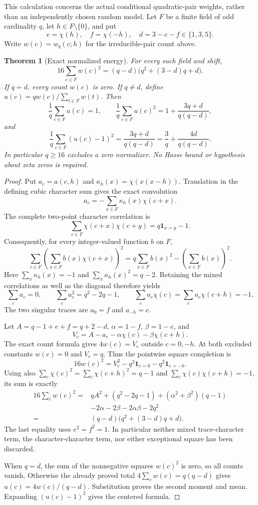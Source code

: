 \documentclass[11pt]{article}
\newtheorem{theorem}{Theorem}[section]
\begin{document}
This calculation concerns the actual conditional quadratic-pair weights,
rather than an independently chosen random model. Let \(F\) be a finite
field of odd cardinality \(q\), let \(h\in F\setminus\{0\}\), and put
\[
 e=\chi(h),\quad f=\chi(-h),\quad d=3-e-f\in\{1,3,5\}.
\]
Write \(w(c)=w_q(c;h)\) for the irreducible-pair count above.

\begin{theorem}[Exact normalized energy]\label{thm:quadraticPairEnergy}
For every such field and shift,
\[
 16\sum_{c\in F}w(c)^2
   =(q-d)\bigl(q^2+(3-d)q+d\bigr).
\]
If \(q=d\), every count \(w(c)\) is zero. If \(q\ne d\), define
\(u(c)=qw(c)/\sum_{t\in F}w(t)\). Then
\[
 \frac1q\sum_{c\in F}u(c)=1,\qquad
 \frac1q\sum_{c\in F}u(c)^2
   =1+\frac{3q+d}{q(q-d)},
\]
and
\[
 \frac1q\sum_{c\in F}(u(c)-1)^2
    =\frac{3q+d}{q(q-d)}
    =\frac3q+\frac{4d}{q(q-d)}.
\]
In particular \(q\geq16\) excludes a zero normalizer. No Hasse
bound or hypothesis about zeta zeros is required.
\end{theorem}

\begin{proof}
Put \(a_c=a(c,h)\) and \(\kappa_h(x)=\chi(x(x-h))\).
Translation in the defining cubic character sum gives the exact convolution
\[
 a_c=-\sum_{x\in F}\kappa_h(x)\chi(c+x).
\]
The complete two-point character correlation is
\[
 \sum_{c\in F}\chi(c+x)\chi(c+y)=q\mathbf1_{x=y}-1.
\]
Consequently, for every integer-valued function \(b\) on \(F\),
\[
 \sum_{c\in F}\left(\sum_{x\in F}b(x)\chi(c+x)\right)^2
    =q\sum_{x\in F}b(x)^2-\left(\sum_{x\in F}b(x)\right)^2.
\]
Here \(\sum_x\kappa_h(x)=-1\) and
\(\sum_x\kappa_h(x)^2=q-2\). Retaining the mixed correlations as
well as the diagonal therefore yields
\[
 \sum_ca_c=0,\qquad \sum_ca_c^2=q^2-2q-1,\qquad
 \sum_ca_c\chi(c)=\sum_ca_c\chi(c+h)=-1.
\]
The two singular traces are \(a_0=f\) and \(a_{-h}=e\).

Let \(A=q-1+e+f=q+2-d\), \(\alpha=1-f\), \(\beta=1-e\), and
\[
 V_c=A-a_c-\alpha\chi(c)-\beta\chi(c+h).
\]
The exact count formula gives \(4w(c)=V_c\) outside \(c=0,-h\).
At both excluded constants \(w(c)=0\) and \(V_c=q\). Thus the
pointwise square completion is
\[
 16w(c)^2=V_c^2-q^2\mathbf1_{c=0}-q^2\mathbf1_{c=-h}.
\]
Using also \(\sum_c\chi(c)^2=\sum_c\chi(c+h)^2=q-1\) and
\(\sum_c\chi(c)\chi(c+h)=-1\), its sum is exactly
\[
\begin{split}
 16\sum_cw(c)^2={}&qA^2+(q^2-2q-1)
       +(\alpha^2+\beta^2)(q-1)\\
       &-2\alpha-2\beta-2\alpha\beta-2q^2\\
   ={}&(q-d)\bigl(q^2+(3-d)q+d\bigr).
\end{split}
\]
The last equality uses \(e^2=f^2=1\). In particular neither mixed
trace-character term, the character-character term, nor either
exceptional square has been discarded.

When \(q=d\), the sum of the nonnegative squares \(w(c)^2\) is zero,
so all counts vanish. Otherwise the already proved total
\(4\sum_cw(c)=q(q-d)\) gives \(u(c)=4w(c)/(q-d)\).
Substitution proves the second moment and mean. Expanding
\((u(c)-1)^2\) gives the centered formula.
\end{proof}
\end{document}
